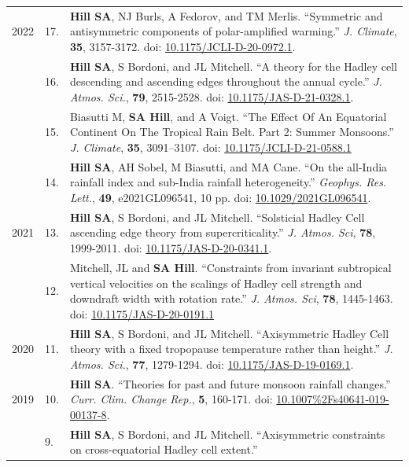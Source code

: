\documentclass[letterpaper,11pt]{shillcv}
\begin{document}
\begin{longtable}{@{} Y{0.05\textwidth} >{\color{black}} p{0.04\textwidth} @{} L{0.91\textwidth} @{}}
2022 & 17. & \textbf{Hill SA}, NJ Burls, A Fedorov, and TM Merlis.  ``Symmetric and antisymmetric components of polar-amplified warming.''  \emph{J. Climate}, \textbf{35}, 3157-3172.  doi: \href{https://doi.org/10.1175/JCLI-D-20-0972.1}{10.1175/JCLI-D-20-0972.1}.\\
     & 16. & \textbf{Hill SA}, S Bordoni, and JL Mitchell.  ``A theory for the Hadley cell descending and ascending edges throughout the annual cycle.''  \emph{J. Atmos. Sci.}, \textbf{79}, 2515-2528.  doi: \href{https://doi.org/10.1175/JAS-D-21-0328.1}{10.1175/JAS-D-21-0328.1}.\\
     & 15. & Biasutti M, \textbf{SA Hill}, and A Voigt.  ``The Effect Of An Equatorial Continent On The Tropical Rain Belt. Part 2: Summer Monsoons.''  \emph{J. Climate}, \textbf{35}, 3091–3107.  doi: \href{https://doi.org/10.1175/JCLI-D-21-0588.1}{10.1175/JCLI-D-21-0588.1}\\
     & 14. & \textbf{Hill SA}, AH Sobel, M Biasutti, and MA Cane.  ``On the all-India rainfall index and sub-India rainfall heterogeneity.''  \emph{Geophys. Res. Lett.}, \textbf{49}, e2021GL096541, 10 pp.  doi: \href{https://doi.org/10.1029/2021GL096541}{10.1029/2021GL096541}.\\
2021 & 13. & \textbf{Hill SA}, S Bordoni, and JL Mitchell.  ``Solsticial Hadley Cell ascending edge theory from supercriticality.''  \emph{J. Atmos. Sci}, \textbf{78}, 1999-2011.  doi: \href{https://doi.org/10.1175/JAS-D-20-0341.1}{10.1175/JAS-D-20-0341.1}.\\
     & 12. & Mitchell, JL and \textbf{SA Hill}.  ``Constraints from invariant subtropical vertical velocities on the scalings of Hadley cell strength and downdraft width with rotation rate.''  \emph{J. Atmos. Sci}, \textbf{78}, 1445-1463.  doi: \href{https://doi.org/10.1175/JAS-D-20-0191.1}{10.1175/JAS-D-20-0191.1}\\
2020 & 11. & \textbf{Hill SA}, S Bordoni, and JL Mitchell.
``Axisymmetric Hadley Cell theory with a fixed tropopause temperature rather
than height.'' \emph{J. Atmos. Sci.}, \textbf{77}, 1279-1294.  doi: \href{https://doi.org/10.1175/JAS-D-19-0169.1}{10.1175/JAS-D-19-0169.1}.\\
2019 & 10. & \textbf{Hill SA}.  ``Theories for past and future monsoon rainfall
changes.'' \emph{Curr. Clim. Change Rep.}, \textbf{5}, 160-171.  doi: \href{https://doi.org/10.1007\%2Fs40641-019-00137-8}{10.1007\%2Fs40641-019-00137-8}.\\
     & 9. & \textbf{Hill SA}, S Bordoni, and JL Mitchell.
``Axisymmetric constraints on cross-equatorial Hadley cell extent.''

\end{longtable}
\end{document}
